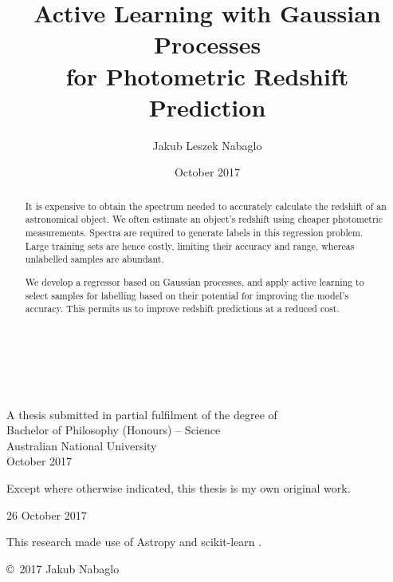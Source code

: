 \documentclass[11pt,twoside,openright]{report}
\title{Active Learning with Gaussian Processes\\for Photometric Redshift Prediction}
\author{Jakub Leszek Nabaglo}
\date{October 2017}
\begin{document}
\begin{titlepage}
  \enlargethispage{2cm}
  \begin{center}
    \makeatletter
    \hspace{0pt} \\[3cm]
    \huge\@title \\[.4cm]

    \LARGE\@author \\[8.5cm]
    \makeatother
    \Large A thesis submitted in partial fulfilment of the degree of \\
    \LARGE Bachelor of Philosophy (Honours) -- Science\\[3cm]

    \LARGE Australian National University \\[1cm]
    October 2017
  \end{center}
\end{titlepage}

\vspace*{5cm}
\begin{center}
  Except where otherwise indicated, this thesis is my own original
  work.
\end{center}

\vspace*{2cm}

\hspace{8cm}\makeatletter\@author\makeatother\par
\hspace{8cm}26 October 2017

\vspace*{12cm}

This research made use of Astropy \citep{Astropy} and scikit-learn \citep{Sklearn}.

\begin{center}
  \copyright\ 2017 Jakub Nabaglo
\end{center}
\noindent

\begin{abstract}
  It is expensive to obtain the spectrum needed to accurately calculate the redshift of an astronomical object. We often estimate an object's redshift using cheaper photometric measurements. Spectra are required to generate labels in this regression problem. Large training sets are hence costly, limiting their accuracy and range, whereas unlabelled samples are abundant.

  We develop a regressor based on Gaussian processes, and apply active learning to select samples for labelling based on their potential for improving the model's accuracy. This permits us to improve redshift predictions at a reduced cost.
\end{abstract}
\end{document}
